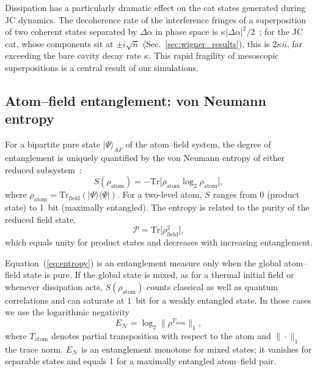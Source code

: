 \documentclass[12pt]{iopart}
\begin{document}
Dissipation has a particularly dramatic effect on the cat states generated during JC dynamics. The decoherence rate of the interference fringes of a superposition of two coherent states separated by $\Delta\alpha$ in phase space is $\kappa|\Delta\alpha|^2/2$~\cite{zurek2003, haroche2006}; for the JC cat, whose components sit at $\pm i\sqrt{\bar{n}}$ (Sec.~\ref{sec:wigner_results}), this is $2\kappa\bar{n}$, far exceeding the bare cavity decay rate $\kappa$. This rapid fragility of mesoscopic superpositions is a central result of our simulations.


\subsection{Atom--field entanglement: von Neumann entropy}
\label{sec:entropy_theory}

For a bipartite pure state $|\Psi\rangle_{AF}$ of the atom--field system, the degree of entanglement is uniquely quantified by the von Neumann entropy of either reduced subsystem~\cite{nielsen2000}:
\begin{equation}
S(\rho_{\text{atom}}) = -\text{Tr}\big[\rho_{\text{atom}} \log_2 \rho_{\text{atom}}\big],
\label{eq:entropy}
\end{equation}
where $\rho_{\text{atom}} = \text{Tr}_{\text{field}}(|\Psi\rangle\langle\Psi|)$. For a two-level atom, $S$ ranges from 0 (product state) to 1~bit (maximally entangled). The entropy is related to the purity of the reduced field state,
\begin{equation}
\mathcal{P} = \text{Tr}\big[\rho_{\text{field}}^2\big],
\label{eq:purity}
\end{equation}
which equals unity for product states and decreases with increasing entanglement.

Equation~(\ref{eq:entropy}) is an entanglement measure only when the global atom--field state is pure. If the global state is mixed, as for a thermal initial field or whenever dissipation acts, $S(\rho_{\text{atom}})$ counts classical as well as quantum correlations and can saturate at 1~bit for a weakly entangled state. In those cases we use the logarithmic negativity~\cite{vidal2002, plenio2005}
\begin{equation}
E_{\mathcal{N}} = \log_2 \big\| \rho^{T_{\text{atom}}} \big\|_1,
\label{eq:logneg}
\end{equation}
where $T_{\text{atom}}$ denotes partial transposition with respect to the atom and $\|\cdot\|_1$ the trace norm. $E_{\mathcal{N}}$ is an entanglement monotone for mixed states; it vanishes for separable states and equals 1 for a maximally entangled atom--field pair.
\end{document}

